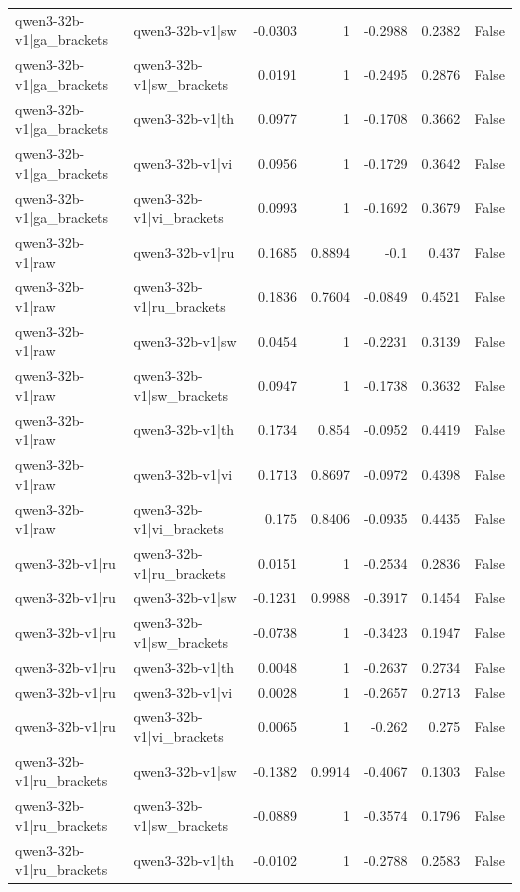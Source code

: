 \begin{table}
\begin{tabular}{l l r r r r l}
qwen3-32b-v1|ga_brackets & qwen3-32b-v1|sw & -0.0303 & 1 & -0.2988 & 0.2382 & False \\
qwen3-32b-v1|ga_brackets & qwen3-32b-v1|sw_brackets & 0.0191 & 1 & -0.2495 & 0.2876 & False \\
qwen3-32b-v1|ga_brackets & qwen3-32b-v1|th & 0.0977 & 1 & -0.1708 & 0.3662 & False \\
qwen3-32b-v1|ga_brackets & qwen3-32b-v1|vi & 0.0956 & 1 & -0.1729 & 0.3642 & False \\
qwen3-32b-v1|ga_brackets & qwen3-32b-v1|vi_brackets & 0.0993 & 1 & -0.1692 & 0.3679 & False \\
qwen3-32b-v1|raw & qwen3-32b-v1|ru & 0.1685 & 0.8894 & -0.1 & 0.437 & False \\
qwen3-32b-v1|raw & qwen3-32b-v1|ru_brackets & 0.1836 & 0.7604 & -0.0849 & 0.4521 & False \\
qwen3-32b-v1|raw & qwen3-32b-v1|sw & 0.0454 & 1 & -0.2231 & 0.3139 & False \\
qwen3-32b-v1|raw & qwen3-32b-v1|sw_brackets & 0.0947 & 1 & -0.1738 & 0.3632 & False \\
qwen3-32b-v1|raw & qwen3-32b-v1|th & 0.1734 & 0.854 & -0.0952 & 0.4419 & False \\
qwen3-32b-v1|raw & qwen3-32b-v1|vi & 0.1713 & 0.8697 & -0.0972 & 0.4398 & False \\
qwen3-32b-v1|raw & qwen3-32b-v1|vi_brackets & 0.175 & 0.8406 & -0.0935 & 0.4435 & False \\
qwen3-32b-v1|ru & qwen3-32b-v1|ru_brackets & 0.0151 & 1 & -0.2534 & 0.2836 & False \\
qwen3-32b-v1|ru & qwen3-32b-v1|sw & -0.1231 & 0.9988 & -0.3917 & 0.1454 & False \\
qwen3-32b-v1|ru & qwen3-32b-v1|sw_brackets & -0.0738 & 1 & -0.3423 & 0.1947 & False \\
qwen3-32b-v1|ru & qwen3-32b-v1|th & 0.0048 & 1 & -0.2637 & 0.2734 & False \\
qwen3-32b-v1|ru & qwen3-32b-v1|vi & 0.0028 & 1 & -0.2657 & 0.2713 & False \\
qwen3-32b-v1|ru & qwen3-32b-v1|vi_brackets & 0.0065 & 1 & -0.262 & 0.275 & False \\
qwen3-32b-v1|ru_brackets & qwen3-32b-v1|sw & -0.1382 & 0.9914 & -0.4067 & 0.1303 & False \\
qwen3-32b-v1|ru_brackets & qwen3-32b-v1|sw_brackets & -0.0889 & 1 & -0.3574 & 0.1796 & False \\
qwen3-32b-v1|ru_brackets & qwen3-32b-v1|th & -0.0102 & 1 & -0.2788 & 0.2583 & False \\

\end{tabular}
\end{table}

